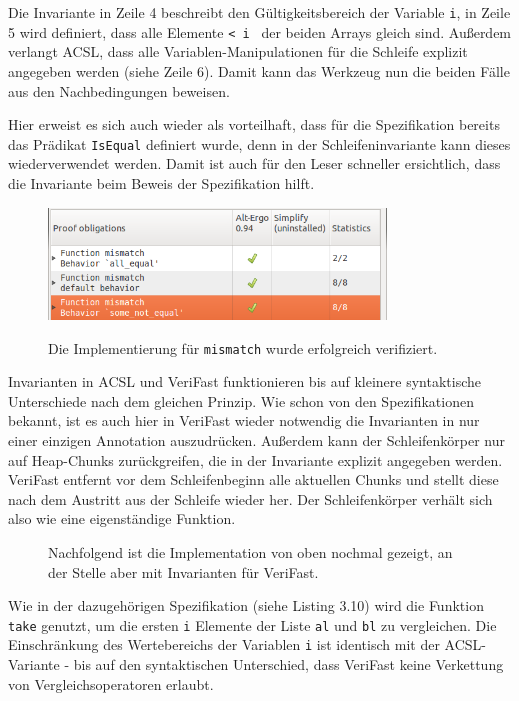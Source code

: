 Die Invariante in Zeile 4 beschreibt den Gültigkeitsbereich der Variable \lstinline{i}, in Zeile 5 wird definiert, 
dass alle Elemente \lstinline{< i } der beiden Arrays gleich sind. Außerdem verlangt ACSL, dass alle
Variablen-Manipulationen für die Schleife explizit angegeben werden (siehe Zeile 6). Damit kann das Werkzeug
nun die beiden Fälle aus den Nachbedingungen beweisen.

Hier erweist es sich auch wieder als vorteilhaft, dass für die Spezifikation bereits das Prädikat
\lstinline{IsEqual} definiert wurde, denn in der Schleifeninvariante kann dieses wiederverwendet werden. Damit
ist auch für den Leser schneller ersichtlich, dass die Invariante beim Beweis der Spezifikation hilft.

\begin{figure}[H]
	\centering
\includegraphics[width=0.8\textwidth]{images/acsl-prove-mismatch.png}

Die Implementierung für \lstinline{mismatch} wurde erfolgreich verifiziert.
\end{figure}

Invarianten in ACSL und VeriFast funktionieren bis auf kleinere syntaktische Unterschiede nach dem gleichen Prinzip.
Wie schon von den Spezifikationen bekannt, ist es auch hier in VeriFast wieder notwendig die Invarianten in nur
einer einzigen Annotation auszudrücken. Außerdem kann der Schleifenkörper nur auf Heap-Chunks zurückgreifen, die
in der Invariante explizit angegeben werden. VeriFast entfernt vor dem Schleifenbeginn alle aktuellen Chunks
und stellt diese nach dem Austritt aus der Schleife wieder her. Der Schleifenkörper verhält sich also
wie eine eigenständige Funktion.

\begin{figure}[H]
Nachfolgend ist die Implementation von oben nochmal gezeigt, an der Stelle aber mit Invarianten für VeriFast.


\end{figure} 

Wie in der dazugehörigen Spezifikation (siehe Listing 3.10) wird die Funktion \lstinline{take} genutzt,
um die ersten \lstinline{i} Elemente der Liste \lstinline{al} und \lstinline{bl} zu vergleichen.
Die Einschränkung des Wertebereichs der Variablen \lstinline{i} ist identisch mit der ACSL-Variante -
bis auf den syntaktischen Unterschied, dass VeriFast keine Verkettung von Vergleichsoperatoren erlaubt.

